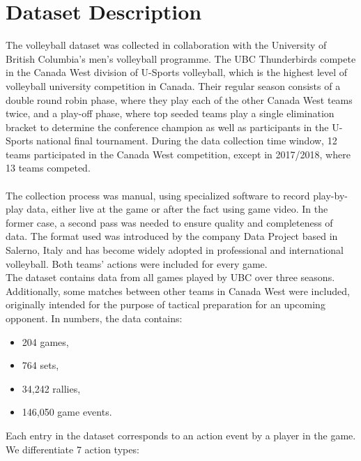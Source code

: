 \documentclass{sfuthesis}
\begin{document}
	\section{Dataset Description}
	The volleyball dataset was collected in collaboration with the University of British Columbia's men's volleyball programme. The UBC Thunderbirds compete in the Canada West division of U-Sports volleyball, which is the highest level of volleyball university competition in Canada. Their regular season consists of a double round robin phase, where they play each of the other Canada West teams twice, and a play-off phase, where top seeded teams play a single elimination bracket to determine the conference champion as well as participants in the U-Sports national final tournament. During the data collection time window, 12 teams participated in the Canada West competition, except in 2017/2018, where 13 teams competed.\\\\
	The collection process was manual, using specialized software to record play-by-play data, either live at the game or after the fact using game video. In the former case, a second pass was needed to ensure quality and completeness of data. The format used was introduced by the company Data Project based in Salerno, Italy and has become widely adopted in professional and international volleyball. Both teams' actions were included for every game.\\
	The dataset contains data from all games played by UBC over three seasons. Additionally, some matches between other teams in Canada West were included, originally intended for the purpose of tactical preparation for an upcoming opponent. In numbers, the data contains:
	\begin{itemize}
		\item 204 games,
		\item 764 sets,
		\item 34,242 rallies,
		\item 146,050 game events.
	\end{itemize}
	Each entry in the dataset corresponds to an action event by a player in the game. We differentiate 7 action types:
\end{document}
